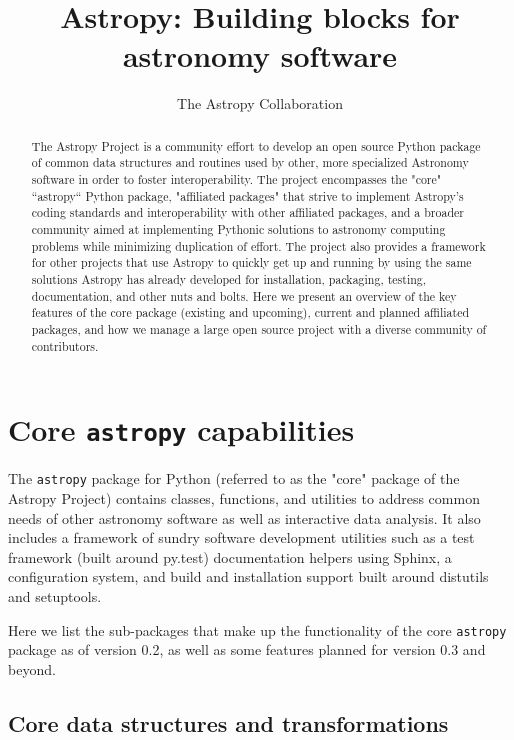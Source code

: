 \documentclass[11pt,twoside]{article}
\begin{document}
\title{Astropy: Building blocks for astronomy software}

\author{The Astropy Collaboration}

\begin{abstract}
The Astropy Project is a community effort to develop an open source Python
package of common data structures and routines used by other, more specialized
Astronomy software in order to foster interoperability.
The project encompasses the "core" ``astropy`` Python package, "affiliated
packages" that strive to implement Astropy's coding standards and
interoperability with other affiliated packages, and a broader community aimed
at implementing Pythonic solutions to astronomy computing problems while
minimizing duplication of effort.  The project also provides a framework for
other projects that use Astropy to quickly get up and running by using the same
solutions Astropy has already developed for installation, packaging, testing,
documentation, and other nuts and bolts.
Here we present an overview of the key features of the core package (existing
and upcoming), current and planned affiliated packages, and how we manage a
large open source project with a diverse community of contributors.
\end{abstract}

\section{Core \texttt{astropy} capabilities}

The \texttt{astropy} package for Python (referred to as the "core" package of
the Astropy Project) contains classes, functions, and utilities to address
common needs of other astronomy software as well as interactive data analysis.
It also includes a framework of sundry software development utilities such as a
test framework (built around py.test) documentation helpers using Sphinx, a
configuration system, and build and installation support built around distutils
and setuptools.

Here we list the sub-packages that make up the functionality of the core
\texttt{astropy} package as of version 0.2, as well as some features planned
for version 0.3 and beyond.

\subsection{Core data structures and transformations}

\end{document}
